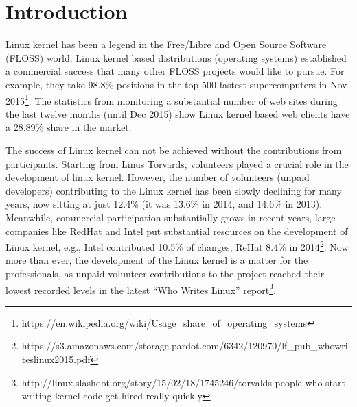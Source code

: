 \documentclass{sig-alternate-05-2015}
\begin{document}
\section{Introduction}

%

Linux kernel has been a legend in the Free/Libre and Open Source Software (FLOSS) world.
Linux kernel based distributions (operating systems) established a commercial success
that many other FLOSS projects would like to pursue.
For example, they take 98.8\% positions in the top 500 fastest supercomputers
in Nov 2015\footnote{https://en.wikipedia.org/wiki/Usage\_share\_of\_operating\_systems}.
The statistics from monitoring a substantial number of web sites during the
last twelve months (until Dec 2015) show Linux kernel based
web clients have a 28.89\% share in the market.

The success of Linux kernel can not be achieved without the contributions
from participants. Starting from Linus Torvards,  volunteers
played a crucial role in the development of linux kernel.
However, the number of volunteers (unpaid developers) contributing to the
Linux kernel has been slowly declining for many years, now sitting at just
 12.4\% (it was 13.6\% in 2014, and 14.6\% in 2013).
Meanwhile, commercial participation substantially grows in recent years,
large companies like RedHat and Intel put substantial resources on the development
of Linux kernel, e.g., Intel contributed 10.5\% of changes, ReHat 8.4\%
in 2014\footnote{https://s3.amazonaws.com/storage.pardot.com/6342/120970/lf\_pub\_whowriteslinux2015.pdf}.
Now more than ever, the development of the Linux kernel is a matter for
the professionals, as unpaid volunteer contributions to the project reached their
lowest recorded levels in the latest ``Who Writes Linux''
report\footnote{http://linux.slashdot.org/story/15/02/18/1745246/torvalds-people-who-start-writing-kernel-code-get-hired-really-quickly}.

\end{document}
